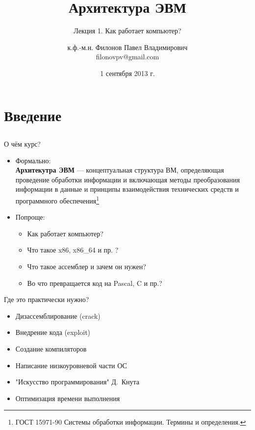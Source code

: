 \documentclass{beamer}
\title{Архитектура ЭВМ}
\subtitle{Лекция 1. Как работает компьютер?}
\author{к.ф.-м.н. Филонов Павел Владимирович \\ filonovpv@gmail.com}
\date{1 сентября 2013 г.}
\institute[МГТУ ГА] 
{
    Московский Государственный Технический Университет \\
    Гражданской Авиации
}
\begin{document}
    \frame{\titlepage}
    \section{Введение}
    \subsection{}
    \begin{frame}{О чём курс?}
        \begin{itemize}
            \item Формально:\\
            {\bf Архитекутра ЭВМ} --- концептуальная структура ВМ, определяющая проведение обработки информации и включающая методы преобразования информации в данные и принципы взаимодействия технических средств и программного обеспечения\footnote{ГОСТ 15971-90 Системы обработки информации. Термины и определения.}
            \bigskip

        \item Попроще:
        \begin{itemize}
            \item Как работает компьютер?
            \item Что такое x86, x86\_64 и пр. ?
            \item Что такое ассемблер и зачем он нужен?
            \item Во что превращается код на Pascal, C и пр.?
        \end{itemize}
        \end{itemize}
    \end{frame}
    \begin{frame}{Где это практически нужно?}
        \begin{itemize}
            \item Дизассемблирование (crack)
            \item Внедрение кода (exploit)
            \item Создание компиляторов
            \item Написание низкоуровневой части ОС
            \item "Искусство программирования" Д.~Кнута
            \item Оптимизация времени выполнения
        \end{itemize}
    \end{frame}
\end{document}
